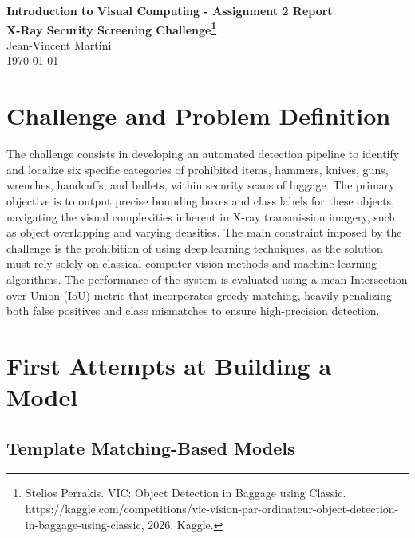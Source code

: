 \documentclass[10pt,a4paper]{article}
\begin{document}
\setcounter{page}{1}

\begin{center}
    {\Large \bf Introduction to Visual Computing - Assignment 2 Report} \\
    {\Large \bf X-Ray Security Screening Challenge\footnote{Stelios Perrakis. VIC: Object Detection in Baggage using Classic. https://kaggle.com/competitions/vic-vision-par-ordinateur-object-detection-in-baggage-using-classic, 2026. Kaggle.}}\\
    {Jean-Vincent Martini}\\
    \today
\end{center}

\section{Challenge and Problem Definition}

The challenge consists in developing an automated detection pipeline to identify and localize six specific categories of prohibited items, hammers, knives, guns, wrenches, handcuffs, and bullets, within security scans of luggage. The primary objective is to output precise bounding boxes and class labels for these objects, navigating the visual complexities inherent in X-ray transmission imagery, such as object overlapping and varying densities. The main constraint imposed by the challenge is the prohibition of using deep learning techniques, as the solution must rely solely on classical computer vision methods and machine learning algorithms. The performance of the system is evaluated using a mean Intersection over Union (IoU) metric that incorporates greedy matching, heavily penalizing both false positives and class mismatches to ensure high-precision detection. 

\section{First Attempts at Building a Model}


\subsection{Template Matching-Based Models}
\end{document}
